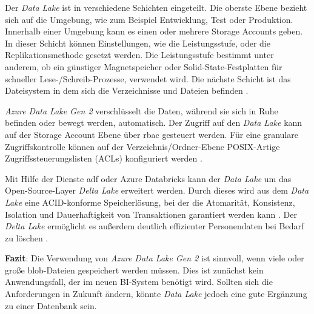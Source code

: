Der \textit{Data Lake} ist in verschiedene Schichten eingeteilt. Die oberste Ebene bezieht sich auf die Umgebung, wie zum Beispiel Entwicklung, Test oder Produktion. Innerhalb einer Umgebung kann es einen oder mehrere Storage Accounts geben. In dieser Schicht können Einstellungen, wie die Leistungsstufe, oder die Replikationsmethode gesetzt werden. Die Leistungsstufe bestimmt unter anderem, ob ein günstiger Magnetspeicher oder Solid-State-Festplatten für schneller Lese-/Schreib-Prozesse, verwendet wird. Die nächste Schicht ist das Dateisystem in dem sich die Verzeichnisse und Dateien befinden \cite{lesteve_definitive_2021}.

\textit{Azure Data Lake Gen 2} verschlüsselt die Daten, während sie sich in Ruhe befinden oder bewegt werden, automatisch. Der Zugriff auf den \textit{Data Lake} kann auf der Storage Account Ebene über \ac{rbac} gesteuert werden. Für eine granulare Zugriffskontrolle können auf der Verzeichnis/Ordner-Ebene POSIX-Artige Zugriffssteuerungslisten (ACLs) konfiguriert werden \cite{lesteve_definitive_2021}.

Mit Hilfe der Dienste \ac{adf} oder Azure Databricks kann der \textit{Data Lake} um das Open-Source-Layer \textit{Delta Lake} erweitert werden. Durch dieses wird aus dem \textit{Data Lake} eine ACID-konforme Speicherlösung, bei der die Atomarität, Konsistenz, Isolation und Dauerhaftigkeit von Transaktionen garantiert werden kann \cite{lesteve_definitive_2021}. Der \textit{Delta Lake} ermöglicht es außerdem deutlich effizienter Personendaten bei Bedarf zu löschen \cite{msdoc_21_deltaLake_gdpr}.

\textbf{Fazit}: Die Verwendung von \textit{Azure Data Lake Gen 2} ist sinnvoll, wenn viele oder große \ac{blob}-Dateien gespeichert werden müssen. Dies ist zunächst kein Anwendungsfall, der im neuen BI-System benötigt wird. Sollten sich die Anforderungen in Zukunft ändern, könnte \textit{Data Lake} jedoch eine gute Ergänzung zu einer Datenbank sein.


